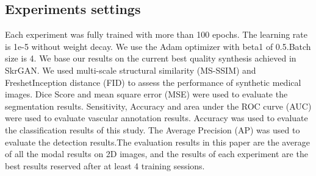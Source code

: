 \documentclass[runningheads]{llncs}
\begin{document}
\subsection{Experiments settings}
Each experiment was fully trained with more than 100 epochs. The learning rate is 1e-5 without weight decay. We use the Adam optimizer with beta1 of 0.5.Batch size is 4.
We base our results on the current best quality synthesis achieved in SkrGAN\cite{96zhang2019skrgan:}. We used multi-scale structural similarity (MS-SSIM) and FreshetInception distance (FID)\cite{148karras2017progressive} to assess the performance of synthetic medical images. Dice Score\cite {95dice1945measures} and mean square error (MSE) were used to evaluate the segmentation results. Sensitivity, Accuracy and area under the ROC curve (AUC) were used to evaluate vascular annotation results. Accuracy was used to evaluate the classification results of this study. The Average Precision (AP) was used to evaluate the detection results.The evaluation results in this paper are the average of all the modal results on 2D images, and the results of each experiment are the best results reserved after at least 4 training sessions.
\end{document}
